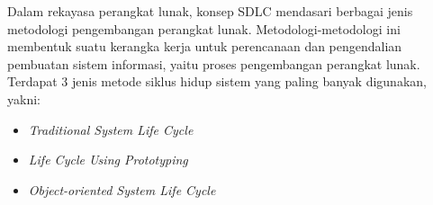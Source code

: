 Dalam rekayasa perangkat lunak, konsep SDLC mendasari berbagai jenis metodologi 
pengembangan perangkat lunak. Metodologi-metodologi ini membentuk suatu kerangka kerja 
untuk perencanaan dan pengendalian pembuatan sistem informasi, yaitu proses pengembangan 
perangkat lunak. Terdapat 3 jenis metode siklus hidup sistem yang paling banyak digunakan, 
yakni: 

\begin{itemize}
    \item \emph{Traditional System Life Cycle}
    \item \emph{Life Cycle Using Prototyping}
    \item \emph{Object-oriented System Life Cycle}
\end{itemize}